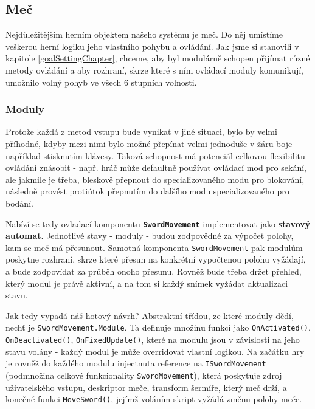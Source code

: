 \subsection{Meč} 

Nejdůležitějším herním objektem našeho systému je meč. Do něj umístíme veškerou herní logiku jeho vlastního pohybu a ovládání. Jak jsme si stanovili v kapitole \ref{goalSettingChapter}, chceme, aby byl modulárně schopen přijímat různé metody ovládání a aby rozhraní, skrze které s ním ovládací moduly komunikují, umožnilo volný pohyb ve všech 6 stupních volnosti.

\subsubsection*{Moduly} \label{interfacesSwordMovementModulesObjectModelSubsubsection}

Protože každá z metod vstupu bude vynikat v jiné situaci, bylo by velmi příhodné, kdyby mezi nimi bylo možné přepínat velmi jednoduše v žáru boje - například stisknutím klávesy. Taková schopnost má potenciál celkovou flexibilitu ovládání znásobit - např. hráč může defaultně používat ovládací mod pro sekání, ale jakmile je třeba, bleskově přepnout do specializovaného modu pro blokování, následně provést protiútok přepnutím do dalšího modu specializovaného pro bodání. 

Nabízí se tedy ovladací komponentu \textbf{\texttt{SwordMovement}} implementovat jako \textbf{stavový automat}. Jednotlivé stavy - moduly - budou zodpovědné za výpočet polohy, kam se meč má přesunout. Samotná komponenta \texttt{SwordMovement} pak modulům poskytne rozhraní, skrze které přesun na konkrétní vypočtenou polohu vyžádají, a bude zodpovídat za průběh onoho přesunu. Rovněž bude třeba držet přehled, který modul je právě aktivní, a na tom si každý snímek vyžádat aktualizaci stavu.

Jak tedy vypadá náš hotový návrh? Abstraktní třídou, ze které moduly dědí, nechť je \texttt{SwordMovement.Module}. Ta definuje množinu funkcí jako \texttt{OnActivated()}, \texttt{OnDeactivated()}, \texttt{OnFixedUpdate()}, které na modulu jsou v závislosti na jeho stavu volány - každý modul je může overridovat vlastní logikou. Na začátku hry je rovněž do každého modulu injectnuta reference na \texttt{ISwordMovement} (podmnožina celkové funkcionality \texttt{SwordMovement}), která poskytuje zdroj uživatelského vstupu, deskriptor meče, transform šermíře, který meč drží, a konečně funkci \texttt{MoveSword()}, jejímž voláním skript vyžádá změnu polohy meče.

